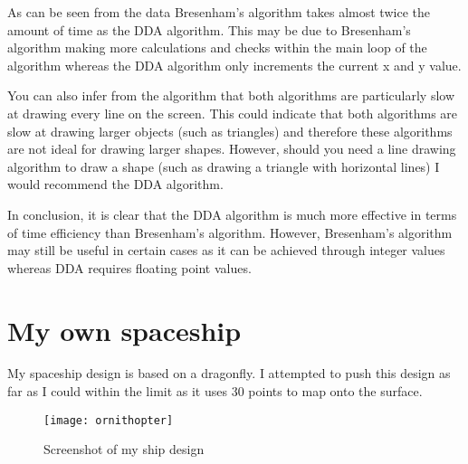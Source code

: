\documentclass[
	a4paper, %
	10pt, %
]{CSUniSchoolLabReport}
\begin{document}
\begin{flushleft}
	As can be seen from the data Bresenham's algorithm takes almost twice the amount of time 
	as the DDA algorithm. This may be due to Bresenham's algorithm making more calculations and checks
	within the main loop of the algorithm whereas the DDA algorithm only increments the current x and y value.
\end{flushleft}
\begin{flushleft}
	You can also infer from the algorithm that both algorithms are particularly slow at drawing every line 
	on the screen. This could indicate that both algorithms are slow at drawing larger objects (such as triangles)
	and therefore these algorithms are not ideal for drawing larger shapes. However, should you need a line 
	drawing algorithm to draw a shape (such as drawing a triangle with horizontal lines) I would recommend
	the DDA algorithm.
\end{flushleft}
\begin{flushleft}
	In conclusion, it is clear that the DDA algorithm is much more effective in terms of time efficiency than
	Bresenham's algorithm. However, Bresenham's algorithm may still be useful in certain cases as it can be 
	achieved through integer values whereas DDA requires floating point values.
\end{flushleft}
\pagebreak
\section{My own spaceship}
\begin{flushleft}
	My spaceship design is based on a dragonfly. I attempted to push this design as 
	far as I could within the limit as it uses 30 points to map onto the surface.
\end{flushleft}
\begin{figure}[h]
	\centering
	\texttt{[image: ornithopter]}
	\caption{Screenshot of my ship design}
\end{figure}

\subsection*{}

\printbibliography%

\end{document}
